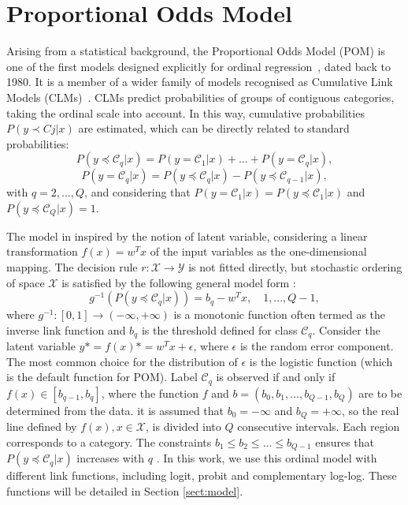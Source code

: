 \documentclass[journal]{IEEEtran}
\begin{document}
	\section{Proportional Odds Model}
	\label{sect:pom}
	Arising from a statistical background, the Proportional Odds Model (POM) is one of the first models designed explicitly for ordinal regression~\cite{mccullagh1980regression}, dated back to 1980. It is a member of a wider family of models recognised as Cumulative Link Models (CLMs)~\cite{agresti2010analysis}. CLMs predict probabilities of groups of contiguous categories, taking the ordinal scale into account. In this way, cumulative probabilities $P(y \prec Cj |x)$ are estimated, which can be directly related to standard probabilities:
	\[
		P(y \preceq \mathcal{C}_q | x) = P(y = \mathcal{C}_1 | x) + ... + P(y = \mathcal{C}_q | x),
	\]
	\[
		P(y = \mathcal{C}_q | x) = P(y \preceq \mathcal{C}_q | x) - P(y \preceq \mathcal{C}_{q-1} | x),
	\]
	with $q = 2, ..., Q$, and considering that $P(y = \mathcal{C}_1 | x) = P(y \preceq \mathcal{C}_1 | x)$ and $P(y \preceq \mathcal{C}_Q | x) = 1$.
	
	The model in inspired by the notion of latent variable, considering a linear transformation $f(x) = w^Tx$ of the input variables as the one-dimensional mapping. The decision rule $r: \mathcal{X} \rightarrow \mathcal{Y}$ is not fitted directly, but stochastic ordering of space $\mathcal{X}$ is satisfied by the following general model form \cite{herbrich2000large}:
	\[
		g^{-1}(P(y \preceq \mathcal{C}_q | x)) = b_q - w^Tx, \quad 1, ..., Q-1,
	\]
	where $g^{-1} : [0,1] \rightarrow (-\infty, +\infty)$ is a monotonic function often termed as the inverse link function and $b_q$ is the threshold defined for class $\mathcal{C}_q$. Consider the latent variable $y* = f(x)* = w^Tx + \epsilon$, where $\epsilon$ is the random error component. The most common choice for the distribution of $\epsilon$ is the logistic function (which is the default function for POM). Label $\mathcal{C}_q$ is observed if and only if $f(x) \in [b_{q-1}, b_q]$, where the function $f$ and $b = (b_0, b_1, ..., b_{Q-1}, b_Q)$ are to be determined from the data. it is assumed that $b_0 = -\infty$ and $b_Q = +\infty$, so the real line defined by $f(x), x \in \mathcal{X}$, is divided into $Q$ consecutive intervals. Each region corresponds to a category. The constraints $b_1 \le b_2 \le ... \le b_{Q-1}$ ensures that $P(y \preceq \mathcal{C}_q | x)$ increases with $q$ \cite{mccullagh1980regression}.
	In this work, we use this ordinal model with different link functions, including logit, probit and complementary log-log. These functions will be detailed in Section \ref{sect:model}.
\end{document}
